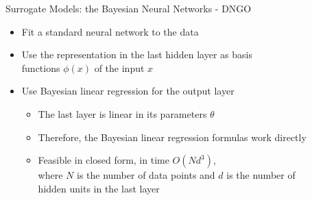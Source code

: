 \begin{frame}[c]{Surrogate Models: the Bayesian Neural Networks - DNGO}

\begin{itemize}
    \item Fit a standard neural network to the data 
    \item Use the representation in the last hidden layer as basis \\ functions $\phi(x)$ of the input $x$ 
    \item Use Bayesian linear regression for the output layer \pause
    \begin{itemize}
        \item The last layer is linear in its parameters $\theta$  
        \item Therefore, the Bayesian linear regression formulas work directly 
        \item Feasible in closed form, in time $O(N d^3)$, \\ where $N$ is the number of data points and $d$ is the number of \\ hidden units in the last layer 
    \end{itemize}
    
\end{itemize}

\end{frame}

